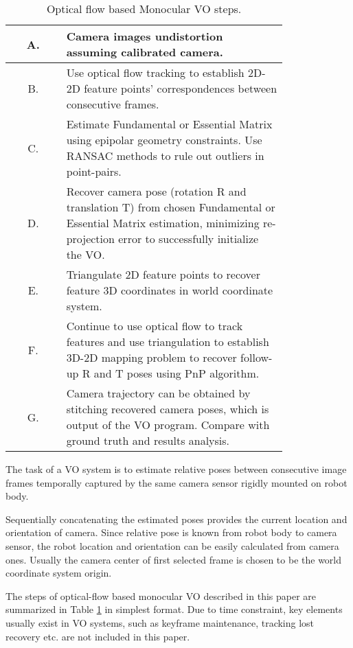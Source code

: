 \documentclass[10pt,twocolumn,letterpaper]{article}
\begin{document}
\begin{table}[t]
\begin{center}
\begin{tabular}{ |c|p{0.8\linewidth}| }
 \hline
 A. & Camera images undistortion assuming calibrated camera. \\ 
 \hline
 B. & Use optical flow tracking to establish 2D-2D feature points’ correspondences between consecutive frames. \\ 
 \hline
 C. & Estimate Fundamental or Essential Matrix using epipolar geometry constraints. Use RANSAC \cite{Fischler:1981:RSC:358669.358692} methods to rule out outliers in point-pairs.\\ 
 \hline
 D. & Recover camera pose (rotation R and translation T) from chosen Fundamental or Essential Matrix estimation, minimizing re-projection error to successfully initialize the VO. \\ 
 \hline
 E. & Triangulate 2D feature points to recover feature 3D coordinates in world coordinate system. \\ 
 \hline
 F. & Continue to use optical flow to track features and use triangulation to establish 3D-2D mapping problem to recover follow-up R and T poses using PnP algorithm. \\ 
 \hline
 G. & Camera trajectory can be obtained by stitching recovered camera poses, which is output of the VO program. Compare with ground truth and results analysis. \\
 \hline
\end{tabular}
\end{center}
\caption{Optical flow based Monocular VO steps.}
\label{table:1}
\end{table}

The task of a VO system is to estimate relative poses between consecutive image frames temporally captured by the same camera sensor rigidly mounted on robot body. 

Sequentially concatenating the estimated poses provides the current location and orientation of camera. Since relative pose is known from robot body to camera sensor, the robot location and orientation can be easily calculated from camera ones. Usually the camera center of first selected frame is chosen to be the world coordinate system origin. 

The steps of optical-flow based monocular VO described in this paper are summarized in Table \ref{table:1} in simplest format. Due to time constraint, key elements usually exist in VO systems, such as keyframe maintenance, tracking lost recovery etc. are not included in this paper. 
\end{document}
